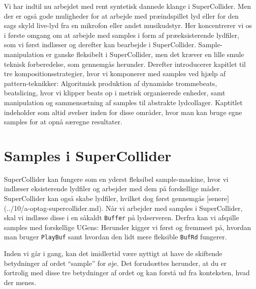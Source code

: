 

Vi har indtil nu arbejdet med rent syntetisk dannede klange i SuperCollider. Men der er også gode muligheder for at arbejde med præindspillet lyd eller for den sags skyld live-lyd fra en mikrofon eller andet musikudstyr. Her koncentrerer vi os i første omgang om at arbejde med samples i form af præeksisterende lydfiler, som vi først indlæser og derefter kan bearbejde i SuperCollider. Sample-manipulation er ganske fleksibelt i SuperCollider, men det kræver en lille smule teknisk forberedelse, som gennemgås herunder. Derefter introducerer kapitlet til tre kompositionsstrategier, hvor vi komponerer med samples ved hjælp af pattern-teknikker: Algoritmisk produktion af dynamiske trommebeats, beatslicing, hvor vi klipper beats op i metrisk organiserede enheder, samt manipulation og sammensætning af samples til abstrakte lydcollager. Kaptitlet indeholder som altid øvelser inden for disse områder, hvor man kan bruge egne samples for at opnå særegne resultater.
\section{Samples i SuperCollider}

SuperCollider kan fungere som en yderst fleksibel sample-maskine, hvor vi indlæser eksisterende lydfiler og arbejder med dem på forskellige måder. SuperCollider kan også skabe lydfiler, hvilket dog først gennemgås [senere](../10/a-optag-supercollider.md). Når vi arbejder med samples i SuperCollider, skal vi indlæse disse i en såkaldt \texttt{Buffer} på lydserveren. Derfra kan vi afspille samples med forskellige UGens: Herunder kigger vi først og fremmest på, hvordan man bruger \texttt{PlayBuf} samt hvordan den lidt mere fleksible \texttt{BufRd} fungerer.

Inden vi går i gang, kan det imidlertid være nyttigt at have de skiftende betydninger af ordet \enquote{sample} for øje. Det forudsættes herunder, at du er fortrolig med disse tre betydninger af ordet og kan forstå ud fra konteksten, hvad der menes.

